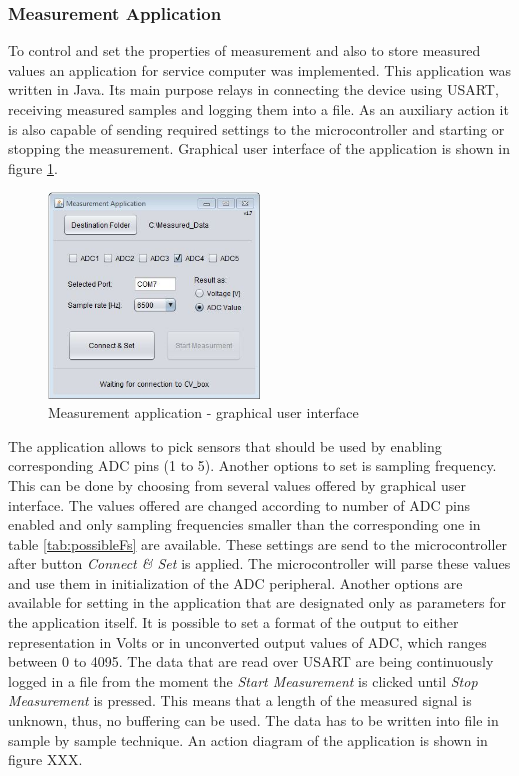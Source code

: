 \documentclass[twoside]{ctuthesis}
\theoremstyle{plain}
\theoremstyle{definition}
\theoremstyle{note}
\begin{document}
\subsubsection{Measurement Application}
To control and set the properties of measurement and also to store measured values an application for service computer was implemented. This application was written in Java. Its main purpose relays in connecting the device using USART, receiving measured samples and logging them into a file. As an auxiliary action it is also capable of sending required settings to the microcontroller and starting or stopping the measurement. Graphical user interface of the application is shown in figure \ref{fig:gui_APP}.
\begin{figure}[h]
	\centering
	\includegraphics[width=0.5\textwidth]{Measurement_app.JPG}
	\caption{Measurement application - graphical user interface}
	\label{fig:gui_APP}
\end{figure}

The application allows to pick sensors that should be used by enabling corresponding ADC pins (1 to 5). Another options to set is sampling frequency. This can be done by choosing from several values offered by graphical user interface. The values offered are changed according to number of ADC pins enabled and only sampling frequencies smaller than the corresponding one in table \ref{tab:possibleFs} are available. These settings are send to the microcontroller after button \textit{Connect \& Set} is applied. The microcontroller will parse these values and use them in initialization of the ADC peripheral.
Another options are available for setting in the application that are designated only as parameters for the application itself. It is possible to set a format of the output to either representation in Volts or in unconverted output values of ADC, which ranges between 0 to 4095.
The data that are read over USART are being continuously logged in a file from the moment the \textit{Start Measurement} is clicked until \textit{Stop Measurement} is pressed. This means that a length of the measured signal is unknown, thus, no buffering can be used. The data has to be written into file in sample by sample technique. An action diagram of the application is shown in figure XXX.
\end{document}
